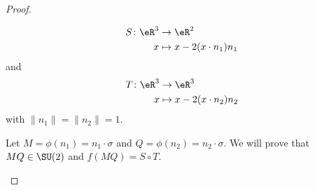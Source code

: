 \begin{proof}
\begin{subproof}
\begin{equation}
                \begin{aligned}
                    S\colon \eR^3&\to \eR^2 \\
                    x&\mapsto x-2(x\cdot n_1)n_1 
                \end{aligned}
            \end{equation}
            and
            \begin{equation}
                \begin{aligned}
                    T\colon \eR^3&\to \eR^3 \\
                    x&\mapsto x-2(x\cdot n_2)n_2 
                \end{aligned}
            \end{equation}
            with \( \| n_1 \|=\| n_2 \|=1\).
            
            Let \( M= \phi(n_1) =n_1\cdot \sigma\) and \( Q=\phi(n_2)=n_2\cdot \sigma\). We will prove that \( MQ\in \SU(2)\) and \( f(MQ)=S\circ T\).


\end{subproof}
\end{proof}
